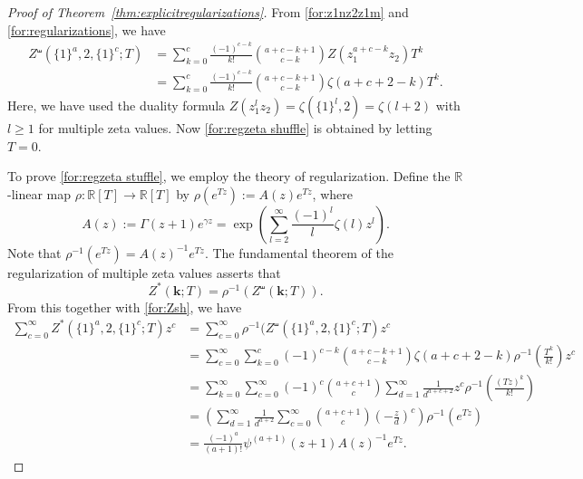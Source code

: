 \documentclass[12pt]{amsart}%
\theoremstyle{definition}
\newcommand{\bk}{\boldsymbol k}
\begin{document}
\begin{proof}[Proof of Theorem~\ref{thm:explicitregularizations}]
From \eqref{for:z1nz2z1m} and \eqref{for:regularizations}, we have 
\begin{align}
Z^{\shuffle}(\{1\}^a,2,\{1\}^c;T)
&=\sum^{c}_{k=0}\frac{(-1)^{c-k}}{k!}\binom{a+c-k+1}{c-k}Z(z^{a+c-k}_1z_2)T^k\nonumber \\
\label{for:Zsh}
&=\sum^{c}_{k=0}\frac{(-1)^{c-k}}{k!}\binom{a+c-k+1}{c-k}\zeta(a+c+2-k)T^k.
\end{align}
Here, we have used the duality formula 
$Z(z^{l}_1z_2)=\zeta(\{1\}^{l},2)=\zeta(l+2)$
with $l\ge 1$ for multiple zeta values.
Now \eqref{for:regzeta shuffle} is obtained by letting $T=0$. 

To prove \eqref{for:regzeta stuffle}, 
we employ the theory of regularization.
Define the $\mathbb{R}$-linear map $\rho:\mathbb{R}[T]\to\mathbb{R}[T]$ by 
$\rho(e^{Tz}):=A(z)e^{Tz}$, where 
\[
A(z):=\Gamma(z+1)e^{\gamma z}
=\exp\left(\sum^{\infty}_{l=2}\frac{(-1)^l}{l}\zeta(l)z^l\right).
\]
Note that $\rho^{-1}(e^{Tz})=A(z)^{-1}e^{Tz}$.
The fundamental theorem of the regularization of multiple zeta values \cite[Theorem~1]{ikz06} asserts that 
\[
Z^{\ast}(\bk;T)
=\rho^{-1}\left(Z^{\shuffle}(\bk;T)\right).
\]
From this together with \eqref{for:Zsh}, 
we have 
\begin{align*}
\sum^{\infty}_{c=0}Z^{\ast}(\{1\}^a,2,\{1\}^c;T)z^c
&=\sum^{\infty}_{c=0}\rho^{-1}(Z^{\shuffle}(\{1\}^a,2,\{1\}^c;T)z^c\\
&=\sum^{\infty}_{c=0}\sum^{c}_{k=0}(-1)^{c-k}\binom{a+c-k+1}{c-k}\zeta(a+c+2-k)\rho^{-1}\left(\frac{T^k}{k!}\right)z^c\\
&=\sum^{\infty}_{k=0}\sum^{\infty}_{c=0}(-1)^{c}\binom{a+c+1}{c}\sum^{\infty}_{d=1}\frac{1}{d^{a+c+2}}z^c\rho^{-1}\left(\frac{(Tz)^k}{k!}\right)\\
 &=\left(\sum^{\infty}_{d=1}\frac{1}{d^{a+2}}\sum^{\infty}_{c=0}\binom{a+c+1}{c}\left(-\frac{z}{d}\right)^c\right)\rho^{-1}(e^{Tz})\\
&=\frac{(-1)^a}{(a+1)!}\psi^{(a+1)}(z+1)A(z)^{-1}e^{Tz}.

\end{align*}
\end{proof}
\end{document}
